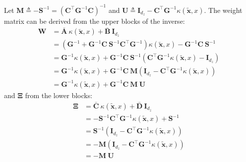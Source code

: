 Let $\mathbf{M}\triangleq-\mathbf{S}^{-1}=\left(\mathbf{C}^\top \mathbf{G}^{-1}\mathbf{C}\right)^{-1}$ and $\mathbf{U}\triangleq \mathbf{I}_{d_z}-\mathbf{C}^\top \mathbf{G}^{-1}\kappa(\tilde{\mathbf{x}},x)$. The weight matrix can be derived from the upper blocks of the inverse:
\begin{equation}
	\begin{aligned}
	\mathbf{W}&=\bar{\mathbf{A}}\:\kappa(\tilde{\mathbf{x}},x)+\bar{\mathbf{B}}\:\mathbf{I}_{d_z}\\
	&=\left(\mathbf{G}^{-1}+\mathbf{G}^{-1}\mathbf{C}\:\mathbf{S}^{-1}\mathbf{C}^\top \mathbf{G}^{-1}\right)\kappa(\tilde{\mathbf{x}},x)-\mathbf{G}^{-1}\mathbf{C}\:\mathbf{S}^{-1}\\
	&=\mathbf{G}^{-1}\kappa(\tilde{\mathbf{x}},x)+\mathbf{G}^{-1}\mathbf{C}\:\mathbf{S}^{-1}\left(\mathbf{C}^\top \mathbf{G}^{-1}\kappa(\tilde{\mathbf{x}},x)-\mathbf{I}_{d_z}\right)\\
	&=\mathbf{G}^{-1}\kappa(\tilde{\mathbf{x}},x)+\mathbf{G}^{-1}\mathbf{C}\:\mathbf{M}\left(\mathbf{I}_{d_z}-\mathbf{C}^\top \mathbf{G}^{-1}\kappa(\tilde{\mathbf{x}},x)\right)\\
	&=\mathbf{G}^{-1}\kappa(\tilde{\mathbf{x}},x)+\mathbf{G}^{-1}\mathbf{C}\:\mathbf{M}\:\mathbf{U}
	\end{aligned}
\end{equation}
and $\boldsymbol{\Xi}$ from the lower blocks:
\begin{equation}
	\begin{aligned}
	\boldsymbol{\Xi}&=\bar{\mathbf{C}}\:\kappa(\tilde{\mathbf{x}},x)+\bar{\mathbf{D}}\:\mathbf{I}_{d_z}\\
	&=-\mathbf{S}^{-1}\mathbf{C}^\top \mathbf{G}^{-1}\kappa(\tilde{\mathbf{x}},x)+\mathbf{S}^{-1}\\
	&=\mathbf{S}^{-1}\left(\mathbf{I}_{d_z}-\mathbf{C}^\top \mathbf{G}^{-1}\kappa(\tilde{\mathbf{x}},x)\right)\\
	&=-\mathbf{M}\left(\mathbf{I}_{d_z}-\mathbf{C}^\top \mathbf{G}^{-1}\kappa(\tilde{\mathbf{x}},x)\right)\\
	&=-\mathbf{M}\:\mathbf{U}
	\end{aligned}
\end{equation}

